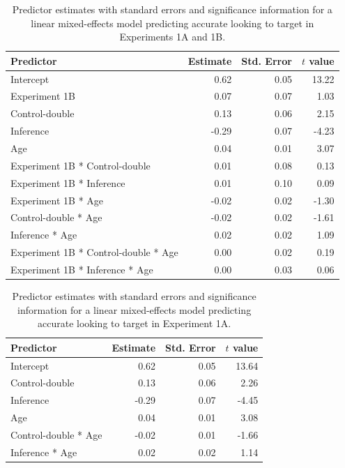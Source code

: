 \documentclass{rsos}
\begin{document}
\begin{table}[!h]
\centering
\begin{tabular}{lrrr}
 Predictor & Estimate & Std. Error & $t$ value \\ 
  \hline
Intercept & 0.62 & 0.05 & 13.22 \\ 
  Experiment 1B & 0.07 & 0.07 & 1.03 \\ 
  Control-double & 0.13 & 0.06 & 2.15 \\ 
  Inference & -0.29 & 0.07 & -4.23 \\ 
  Age & 0.04 & 0.01 & 3.07 \\ 
  Experiment 1B * Control-double & 0.01 & 0.08 & 0.13 \\ 
  Experiment 1B * Inference & 0.01 & 0.10 & 0.09 \\ 
  Experiment 1B * Age & -0.02 & 0.02 & -1.30 \\ 
  Control-double * Age & -0.02 & 0.02 & -1.61 \\ 
  Inference * Age & 0.02 & 0.02 & 1.09 \\ 
  Experiment 1B * Control-double * Age & 0.00 & 0.02 & 0.19 \\ 
  Experiment 1B * Inference * Age & 0.00 & 0.03 & 0.06 \\ 
   \hline
\end{tabular}
\caption{Predictor estimates with standard errors and significance information for a linear mixed-effects model predicting accurate looking to target in Experiments 1A and 1B.} 
\label{tab:exp2_tab}
\end{table}

\vspace*{-10pt}

\begin{table}[!h]
\centering
\begin{tabular}{lrrr}
 Predictor & Estimate & Std. Error & $t$ value \\ 
  \hline
Intercept & 0.62 & 0.05 & 13.64 \\ 
  Control-double & 0.13 & 0.06 & 2.26 \\ 
  Inference & -0.29 & 0.07 & -4.45 \\ 
  Age & 0.04 & 0.01 & 3.08 \\ 
  Control-double * Age & -0.02 & 0.01 & -1.66 \\ 
  Inference * Age & 0.02 & 0.02 & 1.14 \\ 
   \hline
\end{tabular}
\caption{Predictor estimates with standard errors and significance information for a linear mixed-effects model predicting accurate looking to target in Experiment 1A.} 
\label{tab:exp1_tab}
\end{table}
\end{document}
